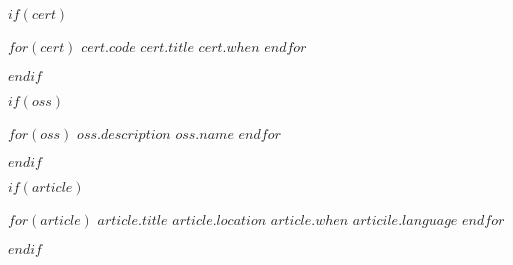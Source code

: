 \documentclass[$fontSize$, $format$]{awesome-cv}
\begin{document}
$if(cert)$
\begin{cventries}
$for(cert)$
    \cventry
        {$cert.code$}
        {$cert.title$}
        {\large\faAws}
        {}
        {$cert.when$}
$endfor$
\end{cventries}
$endif$

$if(oss)$
\begin{cventries}
    $for(oss)$
    \cventry
        {$oss.description$}
        {\href{$oss.url$}{$oss.name$}}
        {\large\faGithub}
        {}
        {}
    $endfor$
\end{cventries}
$endif$

$if(article)$
\begin{cventries}
    $for(article)$
    \cventry
        {$article.title$}
        {$article.location$}
        {$article.when$}
        {$articile.language$}
        {}
    $endfor$
\end{cventries}
$endif$
\end{document}
